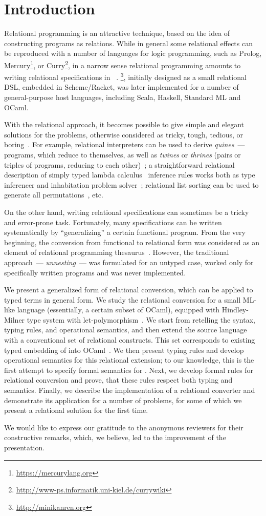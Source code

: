 \section{Introduction}
\label{intro}

Relational programming is an attractive technique, based on the idea of constructing programs as relations.
While in general some relational effects can be reproduced with a number of languages for logic programming, such as
Prolog, Mercury\footnote{\url{https://mercurylang.org}}, or Curry\footnote{\url{http://www-ps.informatik.uni-kiel.de/currywiki}}, in
a narrow sense relational programming amounts to writing relational specifications in \miniKanren~\cite{TRS}. \miniKanren\footnote{\url{http://minikanren.org}},
initially designed as a small relational DSL, embedded in Scheme/Racket, was later implemented for a number of general-purpose host languages,
including Scala, Haskell, Standard ML and OCaml.

With the relational approach, it becomes possible to give simple and elegant solutions for the problems, otherwise
considered as tricky, tough, tedious, or boring~\cite{unified}. For example, relational interpreters can be used to derive
\emph{quines}~--- programs, which reduce to themselves, as well as \emph{twines} or \emph{thrines} (pairs or triples of
programs, reducing to each other)~\cite{Untagged}; a straightforward relational description of
simply typed lambda calculus~\cite{Lambda} inference rules works both as type inferencer and inhabitation problem solver~\cite{WillThesis};
relational list sorting can be used to generate all permutations~\cite{ocanren}, etc. 

On the other hand, writing relational specifications can sometimes be a tricky and error-prone task. Fortunately, many 
specifications can be written systematically by ``generalizing'' a certain functional program. From the very beginning, 
the conversion from functional to relational form was considered as an element of relational programming thesaurus~\cite{TRS}. However,
the traditional approach~--- \emph{unnesting}~--- was formulated for an untyped case, worked only for specifically written
programs and was never implemented.

We present a generalized form of relational conversion, which can be applied to typed terms in general form. We study the relational conversion 
for a small ML-like language (essentially, a certain subset of OCaml), equipped with Hindley-Milner type system with let-polymorphism~\cite{Types}. 
We start from retelling the syntax, typing rules, and operational semantics, and then extend the source language with a conventional set of 
relational constructs. This set corresponds to existing typed embedding of \miniKanren into OCaml~\cite{ocanren}. We then present typing rules and 
develop operational semantics for this relational extension; to our knowledge, this is the first attempt to specify formal semantics for
\miniKanren. Next, we develop formal rules for relational conversion and prove, that these rules respect both typing and
semantics. Finally, we describe the implementation of a relational converter and demonstrate its application for a number of problems, for some
of which we present a relational solution for the first time.

We would like to express our gratitude to the anonymous reviewers for their constructive remarks, which, we believe, led to the improvement of the presentation. 
